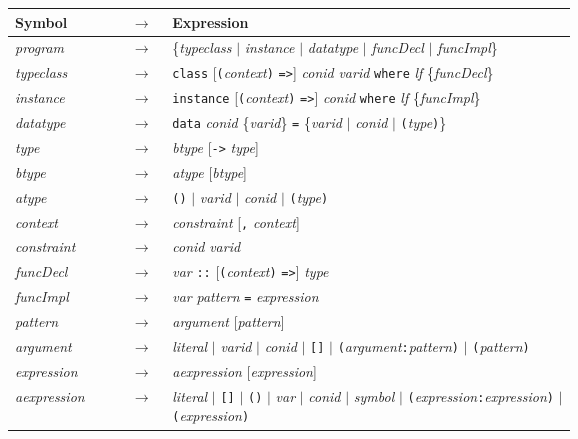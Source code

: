 \begin{figure}
    \centering
\begin{tabular}{l c p{0.72\linewidth}}

Symbol & $\rightarrow$ & Expression\\\hline
\textit{program} & $\rightarrow$ & \{\textit{typeclass} $|$ \textit{instance} $|$ \textit{datatype} $|$ \textit{funcDecl} $|$ \textit{funcImpl}\}\\
\textit{typeclass} & $\rightarrow$ & \texttt{class} [\texttt{(}\textit{context}\texttt{)} \texttt{=>}] \textit{conid} \textit{varid} \texttt{where} \textit{lf} \{\textit{funcDecl}\}\\
\textit{instance} & $\rightarrow$ & \texttt{instance} [\texttt{(}\textit{context}\texttt{)} \texttt{=>}] \textit{conid} \texttt{where} \textit{lf} \{\textit{funcImpl}\}\\
\textit{datatype} & $\rightarrow$ & \texttt{data} \textit{conid} \{\textit{varid}\} \texttt{=} \{\textit{varid} $|$ \textit{conid} $|$ \texttt{(}\textit{type}\texttt{)}\}\\
\textit{type} & $\rightarrow$ & \textit{btype} [\texttt{->} \textit{type}]\\
\textit{btype} & $\rightarrow$ & \textit{atype} [\textit{btype}]\\
\textit{atype} & $\rightarrow$ & \texttt{()} $|$ \textit{varid} $|$ \textit{conid} $|$ \texttt{(}\textit{type}\texttt{)}\\
\textit{context} & $\rightarrow$ & \textit{constraint} [\texttt{,} \textit{context}]\\
\textit{constraint} & $\rightarrow$ & \textit{conid} \textit{varid}\\
\textit{funcDecl} & $\rightarrow$ & \textit{var} \texttt{::} [\texttt{(}\textit{context}\texttt{)} \texttt{=>}] \textit{type}\\
\textit{funcImpl} & $\rightarrow$ & \textit{var} \textit{pattern} \texttt{=} \textit{expression}\\
\textit{pattern} & $\rightarrow$ & \textit{argument} [\textit{pattern}]\\
\textit{argument} & $\rightarrow$ & \textit{literal} $|$ \textit{varid} $|$
\textit{conid} $|$ \texttt{[]} $|$ \texttt{(}\textit{argument}\texttt{:}\textit{pattern}\texttt{)} $|$ \texttt{(}\textit{pattern}\texttt{)}\\ 
\textit{expression} & $\rightarrow$ & \textit{aexpression} [\textit{expression}]\\
\textit{aexpression} & $\rightarrow$ & \textit{literal} $|$ \texttt{[]} $|$ \texttt{()} $|$ \textit{var} $|$ \textit{conid} $|$ \textit{symbol} $|$ \texttt{(}\textit{expression}\texttt{:}\textit{expression}\texttt{)} $|$ \texttt{(}\textit{expression}\texttt{)}\\

\end{tabular}
\end{figure}

